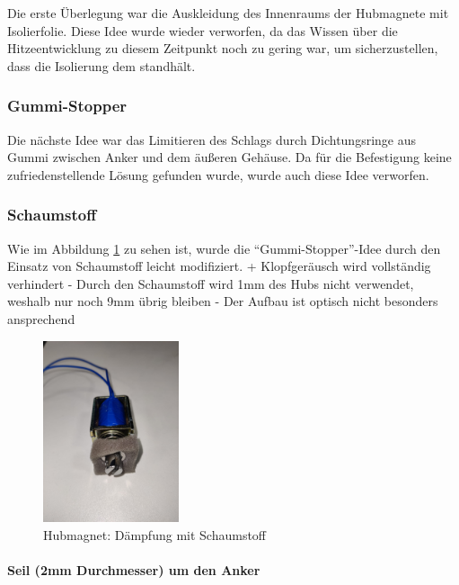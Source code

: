 Die erste Überlegung war die Auskleidung des Innenraums der Hubmagnete mit Isolierfolie.
Diese Idee wurde wieder verworfen, da das Wissen über die Hitzeentwicklung zu diesem Zeitpunkt noch zu gering war, um sicherzustellen, dass die Isolierung dem standhält. %

\subsubsection{Gummi-Stopper}

Die nächste Idee war das Limitieren des Schlags durch Dichtungsringe aus Gummi
zwischen Anker und dem äußeren Gehäuse.
Da für die Befestigung keine zufriedenstellende Lösung gefunden wurde, wurde auch diese Idee verworfen.

\subsubsection{Schaumstoff}

Wie im Abbildung \ref{fig:schaumstoff} zu sehen ist, wurde die \enquote{Gummi-Stopper}-Idee durch den Einsatz von Schaumstoff leicht modifiziert. \newline
+ Klopfgeräusch wird vollständig verhindert \newline
- Durch den Schaumstoff wird 1mm des Hubs nicht verwendet, weshalb nur noch 9mm übrig bleiben \newline
- Der Aufbau ist optisch nicht besonders ansprechend

\begin{figure}[htbp]
    \centering
    \includegraphics [width=4cm] {img/Daempfung_Schaumstoff}
    \caption{Hubmagnet: Dämpfung mit Schaumstoff}
    \label{fig:schaumstoff}
\end{figure}

\paragraph{Seil (2mm Durchmesser) um den Anker}

